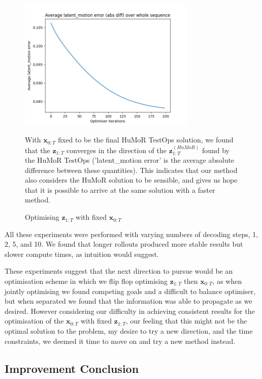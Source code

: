 \begin{figure}
    \centering
    \includegraphics[width=0.75\textwidth]{Figures/humor/experiments/avg_latent_motion_error.png}
    \caption{Optimising $\mathbf{z}_{1:T}$ with fixed $\mathbf{x}_{0:T}$}
    \label{fig:zs_converge_to_humor_zs}
    \medskip
    \small
    With $\mathbf{x}_{0:T}$ fixed to be the final HuMoR TestOps solution, we found that the $\mathbf{z}_{1:T}$ converges in the direction of the $\mathbf{z}_{1:T}^{(HuMoR)}$ found by the HuMoR TestOps ('latent\_motion error' is the average absolute difference between these quantities). This indicates that our method also considers the HuMoR solution to be sensible, and gives us hope that it is possible to arrive at the same solution with a faster method.
\end{figure}

All these experiments were performed with varying numbers of decoding steps, 1, 2, 5, and 10. We found that longer rollouts produced more stable results but slower compute times, as intuition would suggest. 

These experiments suggest that the next direction to pursue would be an optimisation scheme in which we flip flop optimising $\mathbf{z}_{1:T}$ then $\mathbf{x}_{0:T}$, as when jointly optimising we found competing goals and a difficult to balance optimiser, but when separated we found that the information was able to propagate as we desired. However considering our difficulty in achieving consistent results for the optimisation of the $\mathbf{x}_{0:T}$ with fixed $\mathbf{z}_{1:T}$, our feeling that this might not be the optimal solution to the problem, my desire to try a new direction, and the time constraints, we deemed it time to move on and try a new method instead.

\subsection{Improvement Conclusion}

